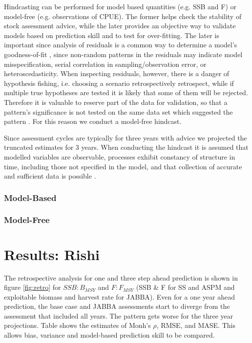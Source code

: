 \documentclass[a4paper]{article}
\begin{document}
Hindcasting can be performed for model based quantities (e.g. SSB and F) or model-free (e.g. observations of CPUE). The former helps check the stability of stock assessment advice, while the later provides an objective way to validate models based on prediction skill and to test for over-fitting. The later is important since analysis of residuals is a common way to determine a model’s goodness-of-fit \citep{Cox1968general}, since  non-random patterns in the residuals may indicate model misspecification, serial correlation in sampling/observation error, or heteroscedasticity. When inspecting residuals, however, there is a danger of hypothesis fishing, i.e. choosing a scenario retrospectively retrospect, while if multiple true hypotheses are tested it is likely that some of them will be rejected. Therefore it is valuable to reserve part of the data for validation, so that a pattern’s significance is not tested on the same data set which suggested the pattern \citep{thygesen2017validation}. For this reason we conduct a model-free hindcast.

Since assessment cycles are typically for three years  with advice \citep{fricker2013three} we projected the truncated estimates for 3 years. When conducting the hindcast it is assumed that modelled variables are observable, processes exhibit constancy of structure in time, including those not specified in the model, and that collection of accurate and sufficient data is possible \citep{hodges1992you}.

\subsubsection{Model-Based}


\subsubsection{Model-Free}


\section{Results: Rishi}

The retrospective analysis for one and three step ahead prediction is shown in figure \ref{fig:retro} for $SSB:B_{MSY}$ and $F:F_{MSY}$ (SSB & F for SS and ASPM and exploitable biomass and harvest rate for JABBA). Even for a one year ahead prediction, the base case and JABBA assessments start to diverge from the assessment that included all years. The pattern gets worse for the three year projections. Table  shows the estimates of Monh's $\rho$, RMSE, and MASE. This allows bias, variance and model-based prediction skill to be compared.
\end{document}
